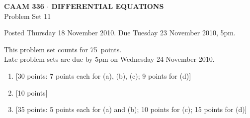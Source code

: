\documentclass[10pt]{article}
\begin{document}
\begin{center}
\large \textsf{\textbf{CAAM 336 $\cdot$ DIFFERENTIAL EQUATIONS}\\[0.5em]
 Problem Set 11 }
\end{center}

Posted Thursday 18 November 2010.  Due Tuesday 23 November 2010, 5pm.

\begin{center}
This problem set counts for 75~points.\\
{Late problem sets are due by 5pm on Wednesday 24 November 2010.}
\end{center}


\begin{enumerate}
\item {[30 points: 7 points each for (a), (b), (c); 9 points for (d)]}\\  

\vspace*{1em}
\item {[10 points]}\\ 

\vspace*{1em}
\item {[35 points: 5 points each for (a) and (b); 10 points for (c); 15 points for (d)]}\\ 


\end{enumerate}
\end{document}
